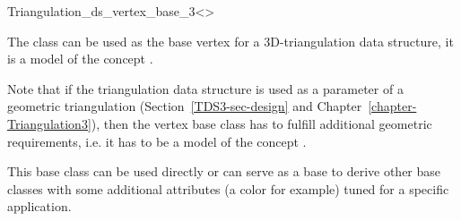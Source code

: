 

\begin{ccRefClass}{Triangulation_ds_vertex_base_3<>}

\ccDefinition

The class  can be used as the base vertex
for a 3D-triangulation data structure, it is a model of the concept
.

Note that if the triangulation data structure is used as a parameter of a
geometric triangulation (Section~\ref{TDS3-sec-design} and
Chapter~\ref{chapter-Triangulation3}), then the vertex base class has to
fulfill additional geometric requirements, i.e. it has to be a model of the
concept .

This base class can be used directly or can serve as a base to derive
other base classes with some additional attributes (a color for
example) tuned for a specific application.


\ccIsModel


\ccSeeAlso

\\



\end{ccRefClass}
